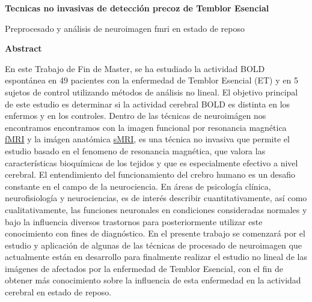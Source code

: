 \thispagestyle{plain}
\begin{center}
    \Large
    \textbf{Tecnicas no invasivas de detección precoz de Temblor Esencial}
    
    \vspace{0.4cm}
    \large
    Preprocesado y análisis de neuroimagen fmri en estado de reposo
    
    \vspace{0.9cm}
    \textbf{Abstract}
\end{center}

En este Trabajo de Fin de Master, se ha estudiado la actividad BOLD espontánea en 49 pacientes con la enfermedad de Temblor Esencial (ET) y en 5 sujetos de control utilizando métodos de análisis no lineal. El objetivo principal de este estudio es determinar si la actividad cerebral BOLD es distinta en los enfermos y en los controles.
Dentro de las técnicas de neuroimágen nos encontramos encontramos con la imagen funcional por resonancia magnética \hyperref[glos:fmri]{fMRI} y la imágen anatómica \hyperref[glos:smri]{sMRI}, es una técnica no invasiva que permite el estudio basado en el fenomeno de resonancia magnética, que valora las características bioquímicas de los tejidos y que es especialmente efectivo a nivel cerebral. 
El entendimiento del funcionamiento del crebro humano es un desafio constante en el campo de la neurociencia. 
En áreas de psicología clínica, neurofisiología y neurociencias, es de interés describir cuantitativamente, así como cualitativamente, las funciones neuronales en condiciones consideradas normales y bajo la influencia diversos trastornos para posteriormente utilizar este conocimiento con fines de diagnóstico.
En el presente trabajo se comenzará por el estudio y aplicación de algunas de las técnicas de procesado de neuroimagen que actualmente están en desarrollo para finalmente realizar el estudio no lineal de las imágenes de afectados por la enfermedad de Temblor Esencial, con el fin de obtener más conocimiento sobre la influencia de esta enfermedad en la actividad cerebral en estado de reposo.  